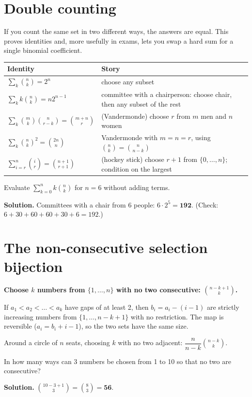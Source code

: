 \documentclass[11pt,a4paper,openany]{report}
\newcommand{\C}[2]{\binom{#1}{#2}}
\begin{document}
\section{Double counting}
If you count the same set in two different ways, the answers are equal. This proves identities and,
more usefully in exams, lets you swap a hard sum for a single binomial coefficient.

\begin{center}
\begin{tabular}{ll}
\toprule
Identity & Story\\\midrule
$\sum_k\C nk=2^n$ & choose any subset\\
$\sum_k k\C nk=n2^{n-1}$ & committee with a chairperson: choose chair, then any subset of the rest\\
$\sum_k\C mk\C n{r-k}=\C{m+n}r$ & (Vandermonde) choose $r$ from $m$ men and $n$ women\\
$\sum_k\C nk^2=\C{2n}n$ & Vandermonde with $m=n=r$, using $\C nk=\C n{n-k}$\\
$\sum_{i=r}^{n}\C ir=\C{n+1}{r+1}$ & (hockey stick) choose $r+1$ from $\{0,\dots,n\}$; condition on the largest\\
\bottomrule
\end{tabular}
\end{center}

\begin{example}
Evaluate $\sum_{k=0}^{n} k\C nk$ for $n=6$ without adding terms.

\textbf{Solution.} Committees with a chair from 6 people: $6\cdot2^5=\mathbf{192}$.
(Check: $6+30+60+60+30+6=192$.)
\end{example}

\section{The non-consecutive selection bijection}
\textbf{Choose $k$ numbers from $\{1,\dots,n\}$ with no two consecutive: $\C{n-k+1}k$.}
\begin{why}
If $a_1<a_2<\dots<a_k$ have gaps of at least 2, then $b_i=a_i-(i-1)$ are strictly increasing numbers from
$\{1,\dots,n-k+1\}$ with no restriction. The map is reversible ($a_i=b_i+i-1$), so the two sets have the same size.
\end{why}
Around a circle of $n$ seats, choosing $k$ with no two adjacent: $\dfrac{n}{n-k}\C{n-k}{k}$.

\begin{example}
In how many ways can 3 numbers be chosen from 1 to 10 so that no two are consecutive?

\textbf{Solution.} $\C{10-3+1}3=\C83=\mathbf{56}$.
\end{example}
\end{document}
